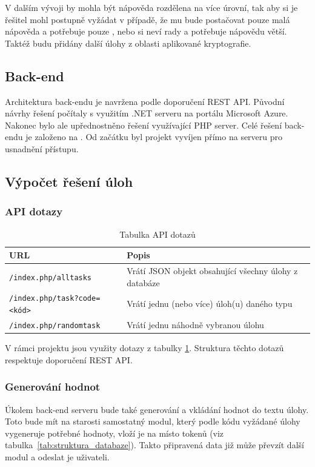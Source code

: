 \documentclass[titlepage]{article}
\begin{document}
V dalším vývoji by mohla být nápověda rozdělena na více úrovní, tak aby si je řešitel mohl postupně vyžádat v případě, že mu bude postačovat pouze malá nápověda a potřebuje pouze , nebo si neví rady a potřebuje nápovědu větší. Taktéž budu přidány další úlohy z oblasti aplikované kryptografie.   

\subsection{Back-end}
Architektura back-endu je navržena podle doporučení REST API. Původní návrhy řešení počítaly s využitím .NET serveru na portálu Microsoft Azure. Nakonec bylo ale upřednostněno řešení využívající PHP server. Celé řešení back-endu je založeno na \cite{restapi}. Od začátku byl projekt vyvíjen přímo na serveru pro usnadnění přístupu. 

\subsection{Výpočet řešení úloh}

\subsubsection{API dotazy}\label{sec:api_dotazy}
\begin{table}[b]
    \centering
    \caption{Tabulka API dotazů}
    \label{tab:api_dotazy}
    \vspace{.5em}
    \begin{tabular}{|l | p{5cm} |}
        \hline
        \textbf{URL} & \textbf{Popis} \\
        \hline \hline
      \texttt{/index.php/alltasks} & Vrátí JSON objekt obsahující všechny úlohy z databáze \\
        \hline
        \texttt{/index.php/task?code=<kód>} & Vrátí jednu (nebo více) úloh(u) daného typu \\
        \hline
        \texttt{/index.php/randomtask} & Vrátí jednu náhodně vybranou úlohu \\
        \hline
    \end{tabular}
\end{table}

V rámci projektu jsou využity dotazy z tabulky \ref{tab:api_dotazy}. Struktura těchto dotazů respektuje doporučení REST API. 

\subsubsection{Generování hodnot}\label{sec:generovani_hodnot}
Úkolem back-end serveru bude také generování a vkládání hodnot do textu úlohy. Toto bude mít na starosti samostatný modul, který podle kódu vyžádané úlohy vygeneruje potřebné hodnoty, vloží je na místo tokenů  (viz tabulka~\ref{tab:struktura_databaze}). Takto připravená data již může převzít další modul a odeslat je uživateli. 
\end{document}
